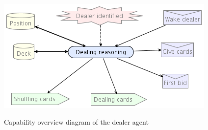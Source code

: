 \documentclass[a4paper]{article}
\begin{document}
\begin{figure}[htp]
  \centering
  \includegraphics[keepaspectratio,scale=0.45]{pdt/images/detailed_design/dealing_capability_overview_diagram.png}
  \label{fig:dealing-cap}
  \caption{Capability overview diagram of the dealer agent}
\end{figure}
\end{document}
